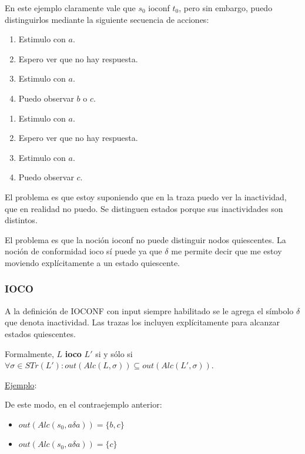 \documentclass[]{article}
\begin{document}
En este ejemplo claramente vale que $s_0$ ioconf $t_0$, pero sin embargo, puedo distinguirlos mediante la siguiente secuencia de acciones:
\begin{multicols}{2}
	\begin{enumerate}
		\item Estimulo con $a$.
		\item Espero ver que no hay respuesta.
		\item Estimulo con $a$.
		\item Puedo observar $b$ o $c$.
	\end{enumerate}
	\begin{enumerate}
		\item Estimulo con $a$.
		\item Espero ver que no hay respuesta.
		\item Estimulo con $a$.
		\item Puedo observar $c$.
	\end{enumerate}
\end{multicols}

El problema es que estoy suponiendo que en la traza puedo ver la inactividad, que en realidad no puedo. Se distinguen estados porque sus inactividades son distintos.

El problema es que la noción ioconf no puede distinguir nodos quiescentes. La noción de conformidad ioco sí puede ya que $\delta$ me permite decir que me estoy moviendo explícitamente a un estado quiescente.

\subsubsection{IOCO}
A la definición de IOCONF con input siempre habilitado se le agrega el símbolo $\delta$ que denota inactividad. Las trazas los incluyen explícitamente para alcanzar estados quiescentes.

Formalmente, $L$ \textbf{ioco} $L'$ si y sólo si $\forall \sigma \in STr(L'): out(Alc(L,\sigma))\subseteq out(Alc(L',\sigma))$.

\underline{Ejemplo}:



De este modo, en el contraejemplo anterior:

\begin{multicols}{2}
	\begin{itemize}
		\item $out(Alc(s_0,a\delta a)) = \{b,c\}$
		\item $out(Alc(s_0,a\delta a)) = \{c\}$
	\end{itemize}
\end{multicols}
\end{document}
